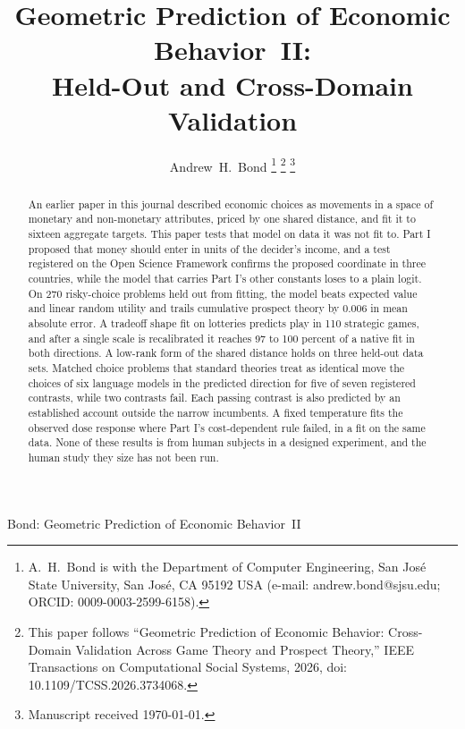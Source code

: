 \documentclass[journal]{IEEEtran}
\begin{document}
\title{Geometric Prediction of Economic Behavior~II:\\Held-Out and Cross-Domain Validation}

\author{Andrew~H.~Bond%
\thanks{A.~H.~Bond is with the Department of Computer Engineering, San Jos\'{e} State University, San Jos\'{e}, CA 95192 USA (e-mail: andrew.bond@sjsu.edu; ORCID: 0009-0003-2599-6158).}%
\thanks{This paper follows ``Geometric Prediction of Economic Behavior: Cross-Domain Validation Across Game Theory and Prospect Theory,'' IEEE Transactions on Computational Social Systems, 2026, doi: 10.1109/TCSS.2026.3734068.}%
\thanks{Manuscript received \today.}}

%
{Bond: Geometric Prediction of Economic Behavior~II}

\maketitle

\begin{abstract}
An earlier paper in this journal described economic choices as movements in a space of monetary and non-monetary attributes, priced by one shared distance, and fit it to sixteen aggregate targets.
This paper tests that model on data it was not fit to.
Part I proposed that money should enter in units of the decider's income, and a test registered on the Open Science Framework confirms the proposed coordinate in three countries, while the model that carries Part I's other constants loses to a plain logit.
On 270 risky-choice problems held out from fitting, the model beats expected value and linear random utility and trails cumulative prospect theory by 0.006 in mean absolute error.
A tradeoff shape fit on lotteries predicts play in 110 strategic games, and after a single scale is recalibrated it reaches 97 to 100 percent of a native fit in both directions.
A low-rank form of the shared distance holds on three held-out data sets.
Matched choice problems that standard theories treat as identical move the choices of six language models in the predicted direction for five of seven registered contrasts, while two contrasts fail.
Each passing contrast is also predicted by an established account outside the narrow incumbents.
A fixed temperature fits the observed dose response where Part I's cost-dependent rule failed, in a fit on the same data.
None of these results is from human subjects in a designed experiment, and the human study they size has not been run.
\end{abstract}
\end{document}
